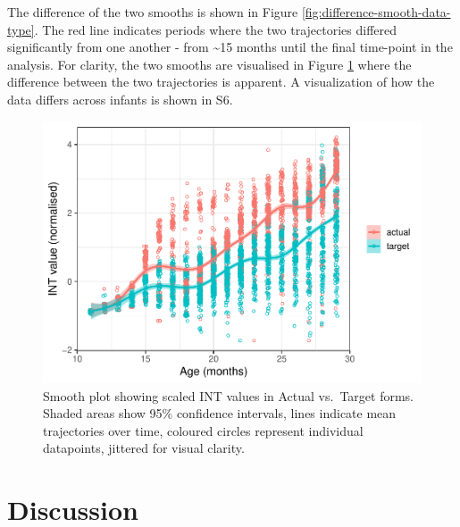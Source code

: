 \documentclass[
  man]{apa6}
\begin{document}
The difference of the two smooths is shown in Figure \ref{fig:difference-smooth-data-type}. The red line indicates periods where the two trajectories differed significantly from one another - from \textasciitilde15 months until the final time-point in the analysis. For clarity, the two smooths are visualised in Figure \ref{fig:plotted-smooth-data-type} where the difference between the two trajectories is apparent. A visualization of how the data differs across infants is shown in S6.

\begin{figure}
\centering
\includegraphics{PhonNetworksProj-accepted_files/figure-latex/plotted-smooth-data-type-1.pdf}
\caption{\label{fig:plotted-smooth-data-type}Smooth plot showing scaled INT values in Actual vs.~Target forms. Shaded areas show 95\% confidence intervals, lines indicate mean trajectories over time, coloured circles represent individual datapoints, jittered for visual clarity.}
\end{figure}

\hypertarget{discussion}{%
\section{Discussion}\label{discussion}}
\end{document}
